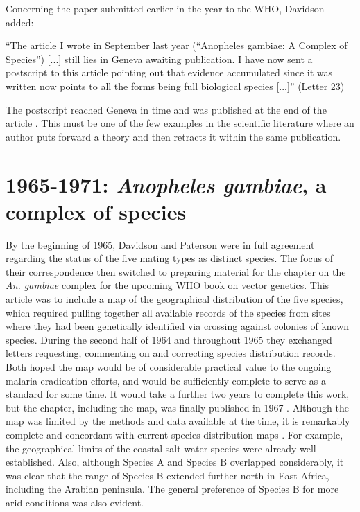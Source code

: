 \documentclass[a4paper,11pt,abstracton,hidelinks]{scrartcl}
\begin{document}
Concerning the paper submitted earlier in the year to the WHO, Davidson added:


\begin{displayquote}
``The article I wrote in September last year (``Anopheles gambiae: A Complex of Species'') [...] still lies in Geneva awaiting publication. I have now sent a postscript to this article pointing out that evidence accumulated since it was written now points to all the forms being full biological species [...]'' (Letter 23)
\end{displayquote}


The postscript reached Geneva in time and was published at the end of the article \citep{Davidson1964}. This must be one of the few examples in the scientific literature where an author puts forward a theory and then retracts it within the same publication.


\section{1965-1971: \textit{Anopheles gambiae}, a complex of species}


By the beginning of 1965, Davidson and Paterson were in full agreement regarding the status of the five mating types as distinct species. 
The focus of their correspondence then switched to preparing material for the chapter on the \textit{An. gambiae} complex for the upcoming WHO book on vector genetics. 
This article was to include a map of the geographical distribution of the five species, which required pulling together all available records of the species from sites where they had been genetically identified via crossing against colonies of known species. 
During the second half of 1964 and throughout 1965 they exchanged letters requesting, commenting on and correcting species distribution records. 
Both hoped the map would be of considerable practical value to the ongoing malaria eradication efforts, and would be sufficiently complete to serve as a standard for some time. 
It would take a further two years to complete this work, but the chapter, including the map, was finally published in 1967 \citep{Davidson1967}. 
Although the map was limited by the methods and data available at the time, it is remarkably complete and concordant with current species distribution maps \citep{Wiebe2017}. 
For example, the geographical limits of the coastal salt-water species were already well-established. 
Also, although Species A and Species B overlapped considerably, it was clear that the range of Species B extended further north in East Africa, including the Arabian peninsula.
The general preference of Species B for more arid conditions was also evident.
\end{document}
